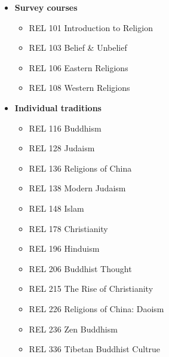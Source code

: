 \documentclass[
  letterpaper,
]{scrbook}
\providecommand{\tightlist}{%
  \setlength{\itemsep}{0pt}\setlength{\parskip}{0pt}}
\begin{document}
\begin{itemize}
\tightlist
\item
  \textbf{Survey courses}

  \begin{itemize}
  \tightlist
  \item
    REL 101 Introduction to Religion
  \item
    REL 103 Belief \& Unbelief
  \item
    REL 106 Eastern Religions
  \item
    REL 108 Western Religions
  \end{itemize}
\item
  \textbf{Individual traditions}

  \begin{itemize}
  \tightlist
  \item
    REL 116 Buddhism
  \item
    REL 128 Judaism
  \item
    REL 136 Religions of China
  \item
    REL 138 Modern Judaism
  \item
    REL 148 Islam
  \item
    REL 178 Christianity
  \item
    REL 196 Hinduism
  \item
    REL 206 Buddhist Thought
  \item
    REL 215 The Rise of Christianity
  \item
    REL 226 Religions of China: Daoism
  \item
    REL 236 Zen Buddhism
  \item
    REL 336 Tibetan Buddhist Cultrue
  \end{itemize}
\end{itemize}
\end{document}
